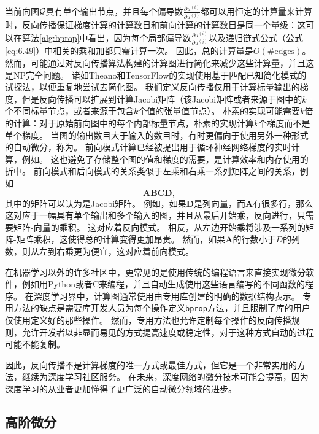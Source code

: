 当前向图$\mathcal{G}$具有单个输出节点，并且每个偏导数$\frac{\partial u^{(i)}}{\partial u^{(j)}}$都可以用恒定的计算量来计算时，反向传播保证梯度计算的计算数目和前向计算的计算数目是同一个量级：这可以在算法\ref{alg:bprop}中看出，因为每个局部偏导数$\frac{\partial u^{(i)}}{\partial u^{(j)}}$以及递归链式公式（公式\ref{eq:6.49}）中相关的乘和加都只需计算一次。
因此，总的计算量是$O(\#\text{edges})$。
然而，可能通过对反向传播算法构建的计算图进行简化来减少这些计算量，并且这是NP完全问题。
诸如Theano和TensorFlow的实现使用基于匹配已知简化模式的试探法，以便重复地尝试去简化图。
我们定义反向传播仅用于计算标量输出的梯度，但是反向传播可以扩展到计算Jacobi矩阵（该Jacobi矩阵或者来源于图中的$k$个不同标量节点，或者来源于包含$k$个值的张量值节点）。
朴素的实现可能需要$k$倍的计算：对于原始前向图中的每个内部标量节点，朴素的实现计算$k$个梯度而不是单个梯度。
当图的输出数目大于输入的数目时，有时更偏向于使用另外一种形式的自动微分，称为。
前向模式计算已经被提出用于循环神经网络梯度的实时计算，例如\citep{Williams89b}。
这也避免了存储整个图的值和梯度的需要，是计算效率和内存使用的折中。
前向模式和后向模式的关系类似于左乘和右乘一系列矩阵之间的关系，例如
\begin{equation}
  \bm{ABCD},
\end{equation}
其中的矩阵可以认为是Jacobi矩阵。
例如，如果$\bm{D}$是列向量，而$\bm{A}$有很多行，那么这对应于一幅具有单个输出和多个输入的图，并且从最后开始乘，反向进行，只需要矩阵-向量的乘积。
这对应着反向模式。
相反，从左边开始乘将涉及一系列的矩阵-矩阵乘积，这使得总的计算变得更加昂贵。
然而，如果$\bm{A}$的行数小于$D$的列数，则从左到右乘更为便宜，这对应着前向模式。

在机器学习以外的许多社区中，更常见的是使用传统的编程语言来直接实现微分软件，例如用Python或者C来编程，并且自动生成使用这些语言编写的不同函数的程序。
在深度学习界中，计算图通常使用由专用库创建的明确的数据结构表示。
专用方法的缺点是需要库开发人员为每个操作定义\verb|bprop|方法，并且限制了库的用户仅使用定义好的那些操作。
然而，专用方法也允许定制每个操作的反向传播规则，允许开发者以非显而易见的方式提高速度或稳定性，对于这种方式自动的过程可能不能复制。

因此，反向传播不是计算梯度的唯一方式或最佳方式，但它是一个非常实用的方法，继续为深度学习社区服务。 
在未来，深度网络的微分技术可能会提高，因为深度学习的从业者更加懂得了更广泛的自动微分领域的进步。
  
  
\subsection{高阶微分}
\label{sec:higher_order_derivatives}

